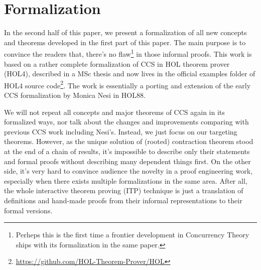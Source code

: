 \documentclass{eptcs} %
\theoremstyle{definition}
\theoremstyle{proposition}
\begin{document}
\section{Formalization}

In the second half of this paper, we present a formalization of all new concepts and
theorems developed in the first part of this paper. The main purpose
is to convince the readers that, there's no flaw\footnote{Perheps this is the first
  time a frontier development in Concurrency Theory ships with its
  formalization in the same paper.} in those informal proofs. This work is based on a rather
complete formalization of CCS in HOL theorem prover
(HOL4), described in a MSc thesis \cite{Chun:2017} and now lives in
the official examples folder of HOL4 source
code\footnote{\url{https://github.com/HOL-Theorem-Prover/HOL}}.
The work is essentially a porting and extension of the early CCS
formalization by Monica Nesi \cite{Nesi} in HOL88.

We will not repeat all concepts and major theorems of CCS again in its
formalized ways, nor talk about the changes and improvements comparing
with previous CCS work including Nesi's. Instead, we just focus on our
targeting theorems. However, as the unique solution of (rooted)
contraction theorem stood at the end of a chain of results, it's
impossible to describe only their statements and formal proofs without
describing many dependent things first.  On the other side, it's very
hard to convince audience the novelty in a proof
engineering work, especially when there exists multiple formalizations
 in the same area. After all, the whole interactive theorem proving (ITP)
technique is just a translation of definitions and hand-made
proofs from their informal representations to their formal versions.
\end{document}

